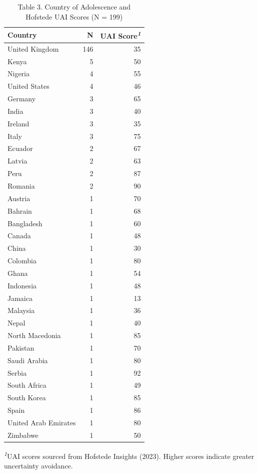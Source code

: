 \documentclass[
]{article}
\begin{document}
\begin{table}[t]
\caption*{
{\fontsize{20}{25}\selectfont  Table 3. Country of Adolescence and Hofstede UAI Scores (N = 199)\fontsize{12}{15}\selectfont }
} 
\fontsize{12.0pt}{14.0pt}\selectfont
\begin{tabular*}{\linewidth}{@{\extracolsep{\fill}}lrr}
\toprule
Country & N & UAI Score\textsuperscript{\textit{1}} \\ 
\midrule\addlinespace[2.5pt]
United Kingdom & 146 & 35 \\ 
Kenya & 5 & 50 \\ 
Nigeria & 4 & 55 \\ 
United States & 4 & 46 \\ 
Germany & 3 & 65 \\ 
India & 3 & 40 \\ 
Ireland & 3 & 35 \\ 
Italy & 3 & 75 \\ 
Ecuador & 2 & 67 \\ 
Latvia & 2 & 63 \\ 
Peru & 2 & 87 \\ 
Romania & 2 & 90 \\ 
Austria & 1 & 70 \\ 
Bahrain & 1 & 68 \\ 
Bangladesh & 1 & 60 \\ 
Canada & 1 & 48 \\ 
China & 1 & 30 \\ 
Colombia & 1 & 80 \\ 
Ghana & 1 & 54 \\ 
Indonesia & 1 & 48 \\ 
Jamaica & 1 & 13 \\ 
Malaysia & 1 & 36 \\ 
Nepal & 1 & 40 \\ 
North Macedonia & 1 & 85 \\ 
Pakistan & 1 & 70 \\ 
Saudi Arabia & 1 & 80 \\ 
Serbia & 1 & 92 \\ 
South Africa & 1 & 49 \\ 
South Korea & 1 & 85 \\ 
Spain & 1 & 86 \\ 
United Arab Emirates & 1 & 80 \\ 
Zimbabwe & 1 & 50 \\ 
\bottomrule
\end{tabular*}
\begin{minipage}{\linewidth}
\vspace{.05em}
\textsuperscript{\textit{1}}UAI scores sourced from Hofstede Insights (2023). Higher scores indicate greater uncertainty avoidance.\\
\end{minipage}
\end{table}
\end{document}

